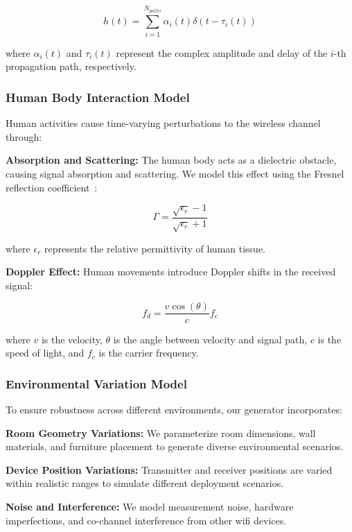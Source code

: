 \documentclass[journal]{IEEEtran}
\begin{document}
\begin{equation}
h(t) = \sum_{i=1}^{N_{paths}} \alpha_i(t) \delta(t - \tau_i(t))
\end{equation}

where $\alpha_i(t)$ and $\tau_i(t)$ represent the complex amplitude and delay of the $i$-th propagation path, respectively.

\subsubsection{Human Body Interaction Model}

Human activities cause time-varying perturbations to the wireless channel through:

\textbf{Absorption and Scattering:} The human body acts as a dielectric obstacle, causing signal absorption and scattering. We model this effect using the Fresnel reflection coefficient~\cite{fresnel_reflection1995}:

\begin{equation}
\Gamma = \frac{\sqrt{\epsilon_r} - 1}{\sqrt{\epsilon_r} + 1}
\end{equation}

where $\epsilon_r$ represents the relative permittivity of human tissue.

\textbf{Doppler Effect:} Human movements introduce Doppler shifts in the received signal:

\begin{equation}
f_d = \frac{v \cos(\theta)}{c} f_c
\end{equation}

where $v$ is the velocity, $\theta$ is the angle between velocity and signal path, $c$ is the speed of light, and $f_c$ is the carrier frequency.

\subsubsection{Environmental Variation Model}

To ensure robustness across different environments, our generator incorporates:

\textbf{Room Geometry Variations:} We parameterize room dimensions, wall materials, and furniture placement to generate diverse environmental scenarios.

\textbf{Device Position Variations:} Transmitter and receiver positions are varied within realistic ranges to simulate different deployment scenarios.

\textbf{Noise and Interference:} We model measurement noise, hardware imperfections, and co-channel interference from other \gls{wifi} devices.
\end{document}
